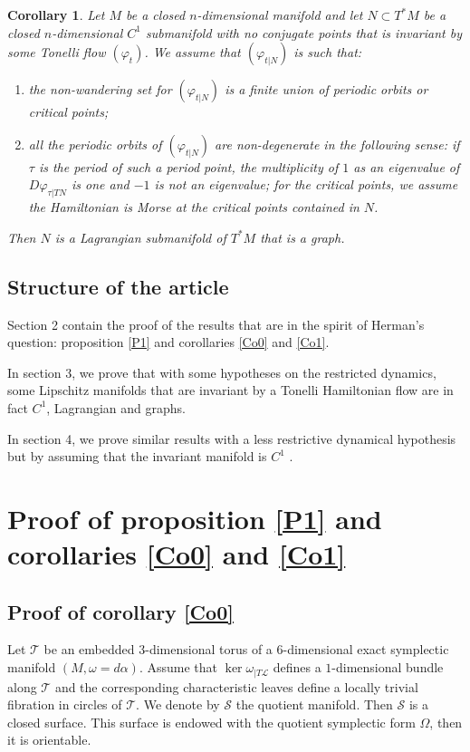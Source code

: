 \documentclass{dcds}
\newtheorem{corollary}{Corollary}
\theoremstyle{definition}
\begin{document}
      \begin{corollary}\label{C3}
   Let $M$ be a closed $n$-dimensional manifold and let $N\subset T^*M$ be a closed $n$-dimensional $C^1$ submanifold with no conjugate points  that is invariant by some Tonelli flow $(\varphi_t)$. We assume that $(\varphi_{t|N})$ is such that:
   \begin{enumerate}
   \item[$\bullet$] the   non-wandering set for $(\varphi_{t|N})$ is a finite union of periodic orbits or critical points;
   \item[$\bullet$] all the periodic orbits of $(\varphi_{t|N})$ are non-degenerate in the following sense: if $\tau$ is the period of such a period point,  the multiplicity of $1$  as an eigenvalue   of $D\varphi_{\tau|TN}$ is   one and $-1$ is not an eigenvalue; for the critical points, we assume the Hamiltonian is Morse at the critical points contained in $N$.
   \end{enumerate}
 Then $N$ is a   Lagrangian submanifold of $T^*M$ that is a graph.
     \end{corollary}

 \subsection{Structure of the article}
Section 2 contain the proof of the results that are in the spirit of Herman's question: proposition \ref{P1} and corollaries \ref{Co0} and  \ref{Co1}.

In section 3, we prove that with some hypotheses on the restricted dynamics, some Lipschitz manifolds that are invariant by a Tonelli Hamiltonian flow are in fact $C^1$, Lagrangian and graphs.

In section 4, we prove similar results with a less restrictive dynamical hypothesis but by assuming that the invariant manifold is $C^1$ .

\section{Proof of  proposition \ref{P1} and corollaries \ref{Co0} and  \ref{Co1}}
\subsection{Proof of corollary \ref{Co0}}
 Let ${\mathcal {T}}$ be an embedded $3$-dimensional torus  of a 6-dimensional exact symplectic manifold $(M,\omega=d\alpha)$. Assume that
  $\ker\omega_{|T{\mathcal {L}}}$ defines a $1$-dimensional bundle along ${\mathcal {T}}$ and the corresponding  characteristic leaves
 define a   locally trivial fibration in circles of ${\mathcal {T}}$.  We denote by ${\mathcal {S}}$ the quotient manifold. Then ${\mathcal {S}}$ is a closed surface. This surface is endowed with the quotient symplectic form $\Omega$, then it is orientable.
\end{document}
